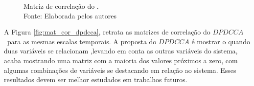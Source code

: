 \begin{figure}[ht]
\begin{minipage}[b]{0.45\textwidth}
    \caption{\pdcca~$n = 69$}
  \end{minipage}
  \captionsetup{justification=centering}
  \caption{Matriz de correlação do \pdcca.\\Fonte: Elaborada pelos autores}\label{fig:mat_cor_pdcca}
\end{figure}

A Figura \ref{fig:mat_cor_dpdcca}, retrata as matrizes de correlação do $DPDCCA$~para as mesmas escalas temporais. A proposta do $DPDCCA$ é mostrar o quando duas variáveis se relacionam ,levando em conta as outras variáveis do sistema, acaba mostrando uma matriz com a maioria dos valores próximos a zero, com algumas combinações de variáveis se destacando em relação ao sistema. Esses resultados devem ser melhor estudados em trabalhos futuros. 

\begin{figure}[ht]
  

\end{figure}
